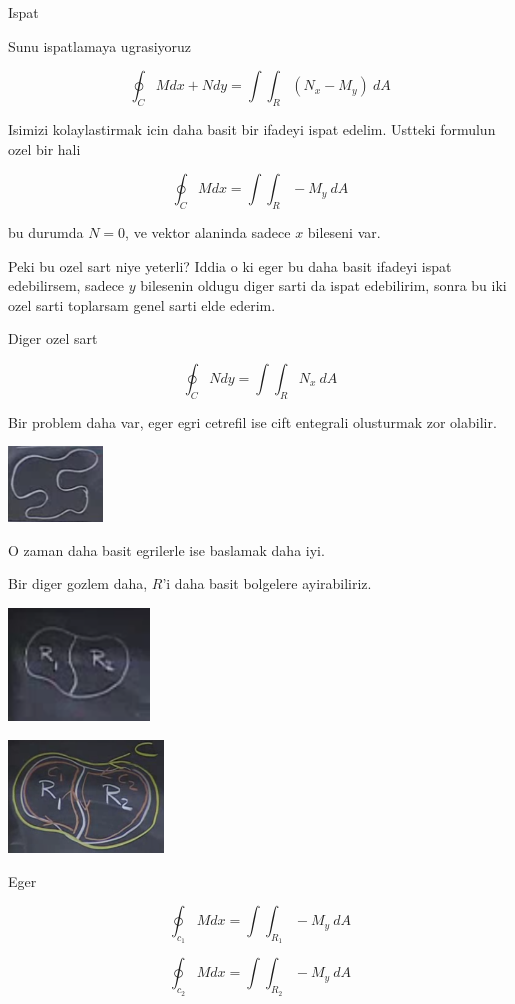 \documentclass[12pt,fleqn]{article}\usepackage{../common}
\begin{document}
Ispat

Sunu ispatlamaya ugrasiyoruz

\[ \oint_C M dx + N dy = \int \int_R (N_x - M_y) \ dA \]

Isimizi kolaylastirmak icin daha basit bir ifadeyi ispat edelim. Ustteki
formulun ozel bir hali

\[ \oint_C M dx  = \int \int_R -M_y \ dA \]

bu durumda $N=0$, ve vektor alaninda sadece $x$ bileseni var. 

Peki bu ozel sart niye yeterli? Iddia o ki eger bu daha basit ifadeyi ispat
edebilirsem, sadece $y$ bilesenin oldugu diger sarti da ispat edebilirim,
sonra bu iki ozel sarti toplarsam genel sarti elde ederim. 

Diger ozel sart

\[ \oint_C N dy  = \int \int_R N_x \ dA \]

Bir problem daha var, eger egri cetrefil ise cift entegrali olusturmak zor
olabilir. 

\includegraphics[height=2cm]{22_3.png}

O zaman daha basit egrilerle ise baslamak daha iyi. 

Bir diger gozlem daha, $R$'i daha basit bolgelere ayirabiliriz. 

\includegraphics[height=3cm]{22_4.png}

\includegraphics[height=3cm]{22_5.png}

Eger 

\[ \oint_{c_1} M dx  = \int \int_{R_1} -M_y \ dA \]

\[ \oint_{c_2} M dx  = \int \int_{R_2} -M_y \ dA \]
\end{document}
